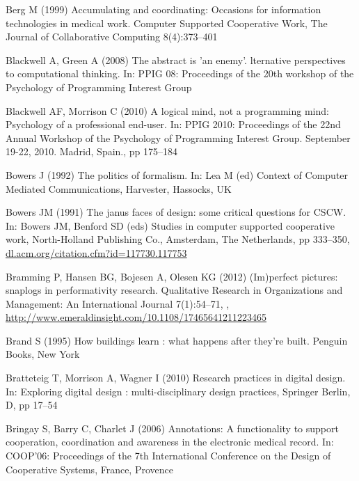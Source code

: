 \documentclass{article}
\begin{document}
\begin{thebibliography}{193}
Berg M (1999) Accumulating and coordinating: Occasions for information
  technologies in medical work. Computer Supported Cooperative Work, The
  Journal of Collaborative Computing 8(4):373--401

Blackwell A, Green A (2008) The abstract is 'an enemy'. lternative perspectives
  to computational thinking. In: {PPIG} 08: Proceedings of the 20th workshop of
  the Psychology of Programming Interest Group

Blackwell AF, Morrison C (2010) A logical mind, not a programming mind:
  Psychology of a professional end-user. In: {PPIG} 2010: Proceedings of the
  22nd Annual Workshop of the Psychology of Programming Interest Group.
  September 19-22, 2010. Madrid, Spain., pp 175--184

Bowers J (1992) The politics of formalism. In: Lea M (ed) Context of Computer
  Mediated Communications, Harvester, Hassocks, {UK}

Bowers JM (1991) The janus faces of design: some critical questions for {CSCW}.
  In: Bowers JM, Benford SD (eds) Studies in computer supported cooperative
  work, North-Holland Publishing Co., Amsterdam, The Netherlands, pp 333--350,
  \urlprefix\url{dl.acm.org/citation.cfm?id=117730.117753}

Bramming P, Hansen BG, Bojesen A, Olesen KG (2012) {(Im)perfect} pictures:
  snaplogs in performativity research. Qualitative Research in Organizations
  and Management: An International Journal 7(1):54--71,
  ,
  \urlprefix\url{http://www.emeraldinsight.com/10.1108/17465641211223465}

Brand S (1995) How buildings learn : what happens after they're built. Penguin
  Books, New York

Bratteteig T, Morrison A, Wagner I (2010) Research practices in digital design.
  In: Exploring digital design : multi-disciplinary design practices, Springer
  Berlin, D, pp 17--54

Bringay S, Barry C, Charlet J (2006) Annotations: A functionality to support
  cooperation, coordination and awareness in the electronic medical record. In:
  {COOP'06:} Proceedings of the 7th International Conference on the Design of
  Cooperative Systems, France, Provence


\end{thebibliography}
\end{document}
